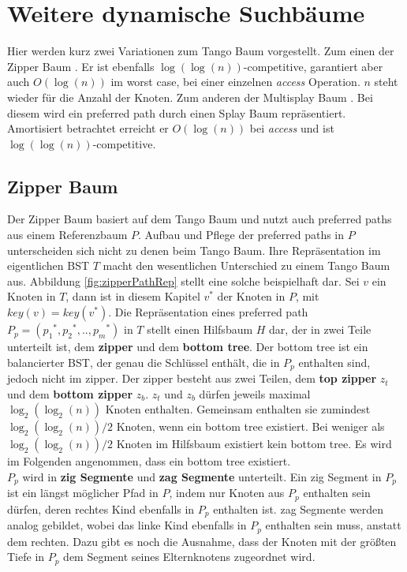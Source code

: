 \documentclass[a4paper,12pt]{article}
\begin{document}
\section {Weitere dynamische Suchbäume}
Hier werden kurz zwei Variationen zum Tango Baum vorgestellt. Zum einen der Zipper Baum \cite{zipper}. Er ist ebenfalls $\log\left(\log\left(n\right)\right)$-competitive,  garantiert aber auch  $O\left(\log \left(n\right)\right)$ im worst case, bei einer einzelnen \textit{access} Operation. $n$ steht wieder für die Anzahl der Knoten. Zum anderen der Multisplay Baum \cite{multisplay}. Bei diesem wird ein preferred path durch einen Splay Baum repräsentiert. Amortisiert betrachtet erreicht er $O\left(\log \left(n\right)\right)$ bei \textit{access} und ist  $\log\left(\log\left(n\right)\right)$-competitive. 

\subsection{Zipper Baum}
Der Zipper Baum basiert auf dem Tango Baum und nutzt auch preferred paths aus einem Referenzbaum $P$. Aufbau und Pflege der preferred paths in $P$ unterscheiden sich nicht zu denen beim Tango Baum.  Ihre Repräsentation im eigentlichen BST $T$ macht den wesentlichen Unterschied zu einem Tango Baum aus. Abbildung \ref{fig:zipperPathRep} stellt eine solche beispielhaft dar.  Sei $v$ ein Knoten in $T$, dann ist in diesem Kapitel $v^*$ der Knoten in $P$, mit $\mathit{key}\left(v\right) =\mathit{key}\left(v^*\right)$. Die Repräsentation eines preferred path  $P_p = \left({p_1}^*,{p_2}^*,..,{p_m}^*\right)$ in $T$ stellt einen Hilfsbaum $H$ dar, der in zwei Teile unterteilt ist, dem \textbf{zipper} und dem \textbf{bottom tree}.  Der bottom tree ist ein balancierter BST, der genau die Schlüssel enthält, die in $P_p$ enthalten sind, jedoch nicht im zipper. Der zipper besteht aus zwei Teilen, dem \textbf{top zipper} $z_t$ und dem \textbf{bottom zipper} $z_b$. $z_t$ und $z_b$ dürfen jeweils maximal $\log_2\left(\log_2\left(n\right)\right)$ Knoten enthalten. Gemeinsam  enthalten sie zumindest $\log_2\left(\log_2\left(n\right)\right) / 2$ Knoten, wenn ein bottom tree existiert. Bei weniger als $\log_2\left(\log_2\left(n\right)\right) / 2$ Knoten im Hilfsbaum existiert kein bottom tree. Es wird im Folgenden angenommen, dass ein bottom tree existiert. \\
$P_p$ wird in \textbf{zig Segmente} und \textbf{zag Segmente} unterteilt. Ein zig Segment in $P_p$ ist ein längst möglicher Pfad in $P$, indem nur Knoten aus $P_p$ enthalten sein dürfen, deren rechtes Kind ebenfalls in $P_p$ enthalten ist. zag Segmente werden analog gebildet, wobei das linke Kind ebenfalls in $P_p$ enthalten sein muss, anstatt dem rechten. Dazu gibt es noch die Ausnahme, dass der Knoten mit der größten Tiefe in $P_p$ dem Segment seines Elternknotens zugeordnet wird.\\
\end{document}
